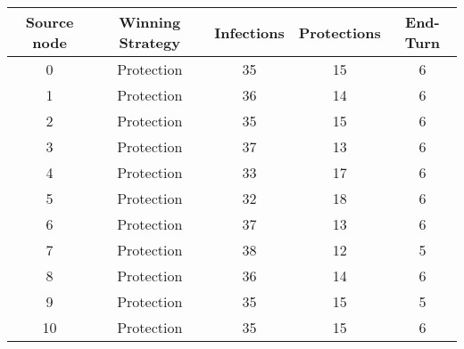\documentclass[results.tex]{subfiles}
\begin{document}
    \begin{center}
        \begin{tabular}{| c || c | c | c | c |}
            \hline
            {\bfseries Source node} & {\bfseries Winning Strategy} & {\bfseries Infections} & {\bfseries Protections}
            & {\bfseries End-Turn}
            \\  %
            \hline\hline
            0                       & Protection                   & 35                     & 15                      & 6                    \\
            \hline
            1                       & Protection                   & 36                     & 14                      & 6                    \\
            \hline
            2                       & Protection                   & 35                     & 15                      & 6                    \\
            \hline
            3                       & Protection                   & 37                     & 13                      & 6                    \\
            \hline
            4                       & Protection                   & 33                     & 17                      & 6                    \\
            \hline
            5                       & Protection                   & 32                     & 18                      & 6                    \\
            \hline
            6                       & Protection                   & 37                     & 13                      & 6                    \\
            \hline
            7                       & Protection                   & 38                     & 12                      & 5                    \\
            \hline
            8                       & Protection                   & 36                     & 14                      & 6                    \\
            \hline
            9                       & Protection                   & 35                     & 15                      & 5                    \\
            \hline
            10                      & Protection                   & 35                     & 15                      & 6                    \\

\end{tabular}
\end{center}
\end{document}
